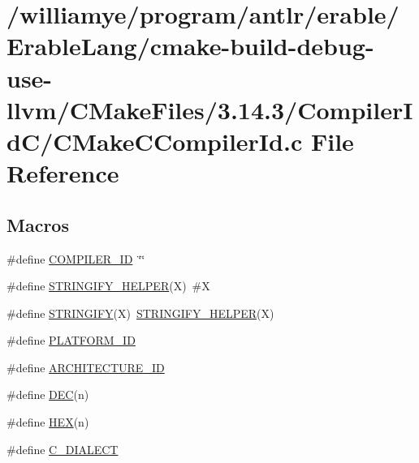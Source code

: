 \hypertarget{cmake-build-debug-use-llvm_2_c_make_files_23_814_83_2_compiler_id_c_2_c_make_c_compiler_id_8c}{}\section{/williamye/program/antlr/erable/\+Erable\+Lang/cmake-\/build-\/debug-\/use-\/llvm/\+C\+Make\+Files/3.14.3/\+Compiler\+Id\+C/\+C\+Make\+C\+Compiler\+Id.c File Reference}
\label{cmake-build-debug-use-llvm_2_c_make_files_23_814_83_2_compiler_id_c_2_c_make_c_compiler_id_8c}
\subsection*{Macros}
\begin{DoxyCompactItemize}
\item 
\#define \mbox{\hyperlink{cmake-build-debug-use-llvm_2_c_make_files_23_814_83_2_compiler_id_c_2_c_make_c_compiler_id_8c_a81dee0709ded976b2e0319239f72d174}{C\+O\+M\+P\+I\+L\+E\+R\+\_\+\+ID}}~\char`\"{}\char`\"{}
\item 
\#define \mbox{\hyperlink{cmake-build-debug-use-llvm_2_c_make_files_23_814_83_2_compiler_id_c_2_c_make_c_compiler_id_8c_a2ae9b72bb13abaabfcf2ee0ba7d3fa1d}{S\+T\+R\+I\+N\+G\+I\+F\+Y\+\_\+\+H\+E\+L\+P\+ER}}(X)~\#X
\item 
\#define \mbox{\hyperlink{cmake-build-debug-use-llvm_2_c_make_files_23_814_83_2_compiler_id_c_2_c_make_c_compiler_id_8c_a43e1cad902b6477bec893cb6430bd6c8}{S\+T\+R\+I\+N\+G\+I\+FY}}(X)~\mbox{\hyperlink{_v_m_2cmake-build-debug_2_c_make_files_23_814_83_2_compiler_id_c_x_x_2_c_make_c_x_x_compiler_id_8cpp_a2ae9b72bb13abaabfcf2ee0ba7d3fa1d}{S\+T\+R\+I\+N\+G\+I\+F\+Y\+\_\+\+H\+E\+L\+P\+ER}}(X)
\item 
\#define \mbox{\hyperlink{cmake-build-debug-use-llvm_2_c_make_files_23_814_83_2_compiler_id_c_2_c_make_c_compiler_id_8c_adbc5372f40838899018fadbc89bd588b}{P\+L\+A\+T\+F\+O\+R\+M\+\_\+\+ID}}
\item 
\#define \mbox{\hyperlink{cmake-build-debug-use-llvm_2_c_make_files_23_814_83_2_compiler_id_c_2_c_make_c_compiler_id_8c_aba35d0d200deaeb06aee95ca297acb28}{A\+R\+C\+H\+I\+T\+E\+C\+T\+U\+R\+E\+\_\+\+ID}}
\item 
\#define \mbox{\hyperlink{cmake-build-debug-use-llvm_2_c_make_files_23_814_83_2_compiler_id_c_2_c_make_c_compiler_id_8c_ad1280362da42492bbc11aa78cbf776ad}{D\+EC}}(n)
\item 
\#define \mbox{\hyperlink{cmake-build-debug-use-llvm_2_c_make_files_23_814_83_2_compiler_id_c_2_c_make_c_compiler_id_8c_a46d5d95daa1bef867bd0179594310ed5}{H\+EX}}(n)
\item 
\#define \mbox{\hyperlink{cmake-build-debug-use-llvm_2_c_make_files_23_814_83_2_compiler_id_c_2_c_make_c_compiler_id_8c_a07f8e5783674099cd7f5110e22a78cdb}{C\+\_\+\+D\+I\+A\+L\+E\+CT}}
\end{DoxyCompactItemize}
